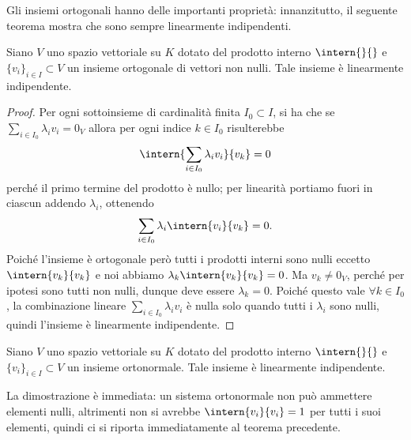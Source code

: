 Gli insiemi ortogonali hanno delle importanti proprietà: innanzitutto, il seguente teorema mostra che sono sempre linearmente indipendenti.
\begin{teorema} \label{t:ortogonale-linearmente-indipendente}
	Siano $V$ uno spazio vettoriale su $K$ dotato del prodotto interno $\intern{}{}$ e $\{  v_i\}_{i\in I}\subset V$ un insieme ortogonale di vettori non nulli.
	Tale insieme è linearmente indipendente.
\end{teorema}
\begin{proof}
	Per ogni sottoinsieme di cardinalità finita $I_0\subset I$, si ha che se $\sum_{i\in I_0}\lambda_i  v_i=0_V$ allora per ogni indice $k\in I_0$ risulterebbe 
	\begin{equation*}
		\intern{\sum_{i\in I_0}\lambda_i  v_i}{  v_k}=0
	\end{equation*}
	perché il primo termine del prodotto è nullo; per linearità portiamo fuori in ciascun addendo $\lambda_i$, ottenendo
	\begin{equation*}
		\sum_{i\in I_0}\lambda_i\intern{  v_i}{  v_k}=0.
	\end{equation*}
	Poiché l'insieme è ortogonale però tutti i prodotti interni sono nulli eccetto $\intern{  v_k}{  v_k}$ e noi abbiamo $\lambda_k\intern{  v_k}{  v_k}=0$.
	Ma $  v_k\neq 0_V$, perché per ipotesi sono tutti non nulli, dunque deve essere $\lambda_k=0$.
	Poiché questo vale $\forall k\in I_0$, la combinazione lineare $\sum_{i\in I_0}\lambda_i  v_i$ è nulla solo quando tutti i $\lambda_i$ sono nulli, quindi l'insieme è linearmente indipendente.
\end{proof}
\begin{corollario} \label{c:ortonormale-linearmente-indipendente}
	Siano $V$ uno spazio vettoriale su $K$ dotato del prodotto interno $\intern{}{}$ e $\{  v_i\}_{i\in I}\subset V$ un insieme ortonormale.
	Tale insieme è linearmente indipendente.
\end{corollario}
La dimostrazione è immediata: un sistema ortonormale non può ammettere elementi nulli, altrimenti non si avrebbe $\intern{  v_i}{  v_i}=1$ per tutti i suoi elementi, quindi ci si riporta immediatamente al teorema precedente.

